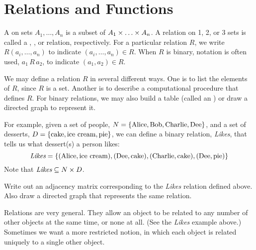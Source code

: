 
\section{Relations and Functions}

\begin{defn}[Relations]
A  on sets $A_1, \ldots, A_n$ is a subset of $A_1 \times \ldots \times A_n$. A relation on 1, 2, or 3 sets is called a , , or  relation, respectively. For a particular relation $R$, we  write $R(a_i, \ldots, a_n)$ to indicate $(a_i, \ldots, a_n) \in R$. When $R$ is binary,  notation is often used, $a_1\,R\,a_2$, to indicate $(a_1, a_2) \in R$.

We may define a relation $R$ in several different ways. One is to list the elements of $R$, since $R$ is a set. Another is to describe a computational procedure that defines $R$. For binary relations, we may also build a table (called an ) or draw a directed graph to represent it.
\end{defn}

\begin{discussion}
For example, given a set of people, $N = \left\lbrace \textrm{Alice}, \textrm{Bob}, \textrm{Charlie}, \textrm{Dee} \right\rbrace$, and a set of desserts, $D = \left\lbrace \textrm{cake}, \textrm{ice cream}, \textrm{pie} \right\rbrace$, we can define a binary relation, \textit{Likes}, that tells us what dessert(s) a person likes: 
\[
	\textit{Likes} = \left\lbrace  (\textrm{Alice}, \textrm{ice cream}), 
					   (\textrm{Dee}, \textrm{cake}),
					   (\textrm{Charlie}, \textrm{cake}),
					   (\textrm{Dee}, \textrm{pie})  \right\rbrace \]
Note that $\textit{Likes} \subseteq N \times D$.
\end{discussion}

\begin{exer1}
Write out an adjacency matrix corresponding to the \textit{Likes} relation defined above. Also draw a directed graph that represents the same relation.
\end{exer1}

\begin{discussion}
Relations are very general. They allow an object to be related to any number of other objects at the same time, or none at all. (See the \textit{Likes} example above.) Sometimes we want a more restricted notion, in which each object is related uniquely to a single other object.
\end{discussion}

